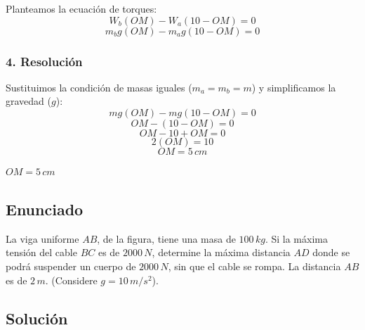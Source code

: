 \documentclass[12pt, a4paper]{article}
\begin{document}
Planteamos la ecuación de torques:
$$W_b (OM) - W_a (10 - OM) = 0$$
$$m_b g (OM) - m_a g (10 - OM) = 0$$

\subsubsection*{4. Resolución}
Sustituimos la condición de masas iguales ($m_a = m_b = m$) y simplificamos la gravedad ($g$):
$$m g (OM) - m g (10 - OM) = 0$$
$$OM - (10 - OM) = 0$$
$$OM - 10 + OM = 0$$
$$2(OM) = 10$$
$$OM = 5 \, \si{cm}$$

\begin{tcolorbox}[colback=green!5!white, colframe=green!50!black, title=Respuesta Final]
\centering \Large $OM = 5 \, \si{cm}$
\end{tcolorbox}

\newpage

\subsection*{Enunciado}
La viga uniforme $AB$, de la figura, tiene una masa de $100 \, \si{kg}$. Si la máxima tensión del cable $BC$ es de $2000 \, \si{N}$, determine la máxima distancia $AD$ donde se podrá suspender un cuerpo de $2000 \, \si{N}$, sin que el cable se rompa. La distancia $AB$ es de $2 \, \si{m}$. (Considere $g=10\,\si{m/s^2}$).

\begin{center}
\end{center}

\subsection*{Solución}
\end{document}
